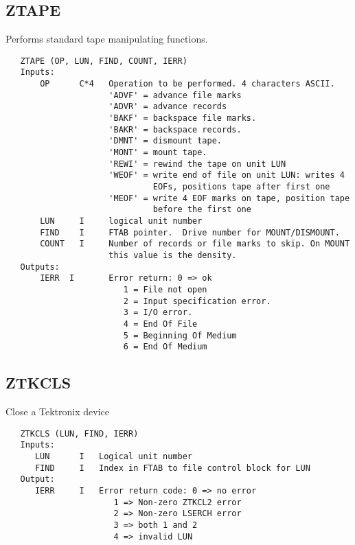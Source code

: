 \subsection{ZTAPE}
Performs standard tape manipulating functions.
\begin{verbatim}
   ZTAPE (OP, LUN, FIND, COUNT, IERR)
   Inputs:
       OP      C*4   Operation to be performed. 4 characters ASCII.
                     'ADVF' = advance file marks
                     'ADVR' = advance records
                     'BAKF' = backspace file marks.
                     'BAKR' = backspace records.
                     'DMNT' = dismount tape.
                     'MONT' = mount tape.
                     'REWI' = rewind the tape on unit LUN
                     'WEOF' = write end of file on unit LUN: writes 4
                              EOFs, positions tape after first one
                     'MEOF' = write 4 EOF marks on tape, position tape
                              before the first one
       LUN     I     logical unit number
       FIND    I     FTAB pointer.  Drive number for MOUNT/DISMOUNT.
       COUNT   I     Number of records or file marks to skip. On MOUNT
                     this value is the density.
   Outputs:
       IERR  I       Error return: 0 => ok
                        1 = File not open
                        2 = Input specification error.
                        3 = I/O error.
                        4 = End Of File
                        5 = Beginning Of Medium
                        6 = End Of Medium

\end{verbatim}

\subsection{ZTKCLS}
Close a Tektronix device
\begin{verbatim}
   ZTKCLS (LUN, FIND, IERR)
   Inputs:
      LUN      I   Logical unit number
      FIND     I   Index in FTAB to file control block for LUN
   Output:
      IERR     I   Error return code: 0 => no error
                      1 => Non-zero ZTKCL2 error
                      2 => Non-zero LSERCH error
                      3 => both 1 and 2
                      4 => invalid LUN

\end{verbatim}

